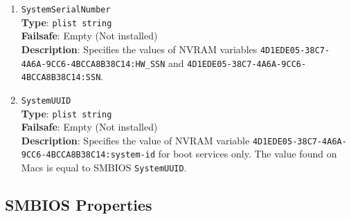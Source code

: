 \documentclass[]{article}
\begin{document}
\begin{enumerate}
\item
  \texttt{SystemSerialNumber}\\
  \textbf{Type}: \texttt{plist\ string}\\
  \textbf{Failsafe}: Empty (Not installed)\\
  \textbf{Description}: Specifies the values of NVRAM variables
  \texttt{4D1EDE05-38C7-4A6A-9CC6-4BCCA8B38C14:HW\_SSN} and
  \texttt{4D1EDE05-38C7-4A6A-9CC6-4BCCA8B38C14:SSN}.

\item
  \texttt{SystemUUID}\\
  \textbf{Type}: \texttt{plist\ string}\\
  \textbf{Failsafe}: Empty (Not installed)\\
  \textbf{Description}: Specifies the value of NVRAM variable
  \texttt{4D1EDE05-38C7-4A6A-9CC6-4BCCA8B38C14:system-id}
  for boot services only. The value found on Macs is equal to SMBIOS
  \texttt{SystemUUID}.

\end{enumerate}

\subsection{SMBIOS Properties}\label{platforminfosmbios}
\end{document}
